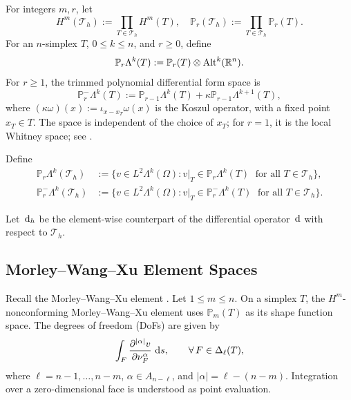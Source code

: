 \documentclass[10pt]{amsart}
\numberwithin{equation}{section}
\newcommand{\dd}{\,{\rm d}}
\newcommand{\grad}{\operatorname{grad}}
\begin{document}
For integers $m, r$,
let 
\begin{equation*}
H^{m}(\mathcal{T}_h):=\prod_{T\in \mathcal{T}_h}H^{m}(T), \quad \mathbb{P}_{r}(\mathcal{T}_h):=\prod_{T\in \mathcal{T}_h}\mathbb{P}_{r}(T). 
\end{equation*}
For an $n$-simplex $T$, $0\leq k\leq n$, and $r\geq0$, define
\[
\mathbb P_r\Lambda^k(T)
:=\mathbb P_r(T)\otimes{\rm Alt}^k(\mathbb R^n).
\]
For $r\geq1$, the trimmed polynomial differential form space is
\[
\mathbb P_r^-\Lambda^k(T)
:=\mathbb P_{r-1}\Lambda^k(T)
+\kappa\mathbb P_{r-1}\Lambda^{k+1}(T),
\]
where $(\kappa\omega)(x):=\iota_{x-x_T}\omega(x)$ is the Koszul operator,
with a fixed point $x_T\in T$.
The space is independent of the choice of $x_T$; for $r=1$, it is the
local Whitney space; see
\cite[Sections~5.1.3 and~5.2]{ArnoldFalkWinther2010}.

Define %
\begin{align*}
	\mathbb P_r\Lambda^k(\mathcal T_h)&:=\{v\in L^2\Lambda^k(\Omega): v|_T\in\mathbb P_r\Lambda^k(T) \;\textrm{ for all } T\in\mathcal{T}_h\}, \\
	\mathbb P_{r}^-\Lambda^k(\mathcal T_h)&:=\{v\in L^2\Lambda^k(\Omega): v|_T\in\mathbb P_{r}^-\Lambda^k(T) \;\textrm{ for all } T\in \mathcal{T}_{h}\}.
\end{align*}

Let $\dd_h$ be the element-wise counterpart of the differential operator
$\dd$ with respect to $\mathcal T_h$.

\subsection{Morley--Wang--Xu Element Spaces}
Recall the Morley--Wang--Xu element \cite{WangXu2013,WangXu2006}. Let \(1\le m\le n\).
On a simplex \(T\), the \(H^m\)-nonconforming Morley--Wang--Xu element uses
\(\mathbb P_m(T)\) as its shape function space. The degrees of freedom (DoFs) are given by
\begin{align}\label{MWXdof}
\int_F \frac{\partial^{|\alpha|} v}{\partial \nu_F^\alpha}\,\dd s,
\qquad \forall\, F\in \Delta_\ell(T),
\end{align}
where \(\ell=n-1,\ldots,n-m\), \(\alpha\in A_{n-\ell}\), and
\(|\alpha|=\ell-(n-m)\).
Integration over a zero-dimensional face is understood as point evaluation.
\end{document}

